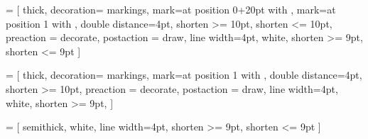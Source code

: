  = 
	[	thick,
		decoration={
			markings,
			mark=at position 0+20pt with
				{},
			mark=at position 1 with {}
			},
		double distance=4pt,
		shorten >= 10pt,
		shorten <= 10pt,
		preaction = {decorate},
		postaction = {
		draw,
		line width=4pt,
		white,
		shorten >= 9pt,
		shorten <= 9pt
		}
  ]
  
 = 
	[	thick,
		decoration={
			markings,
			mark=at position 1 with
				{}
			},
		double distance=4pt,
		shorten >= 10pt,
		preaction = {decorate},
		postaction = {
		draw,
		line width=4pt,
		white,
		shorten >= 9pt,
		}
  ]
  
 = 
	[	semithick,
		white,
		line width=4pt,
		shorten >= 9pt,
		shorten <= 9pt
	]

